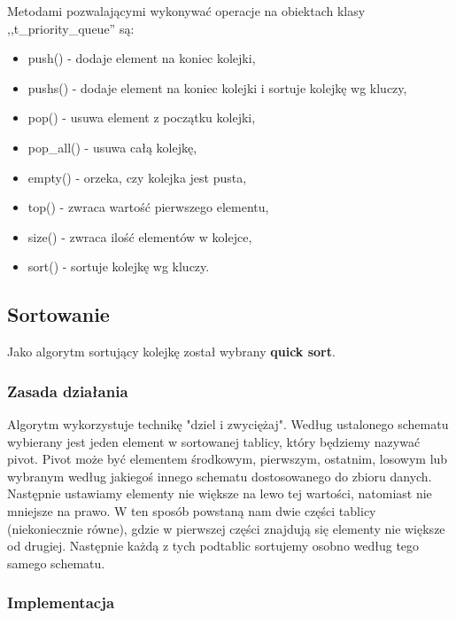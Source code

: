 \documentclass[12pt]{article}
\begin{document}
Metodami pozwalającymi wykonywać operacje na obiektach klasy ,,t\_priority\_queue'' są:
\begin{itemize}
    \item push() - dodaje element na koniec kolejki,
    \item pushs() - dodaje element na koniec kolejki i sortuje kolejkę wg kluczy,
    \item pop() - usuwa element z początku kolejki,
    \item pop\_all() - usuwa całą kolejkę,
    \item empty() - orzeka, czy kolejka jest pusta,
    \item top() - zwraca wartość pierwszego elementu,
    \item size() - zwraca ilość elementów w kolejce,
    \item sort() - sortuje kolejkę wg kluczy. 
\end{itemize}

\subsection{Sortowanie}

Jako algorytm sortujący kolejkę został wybrany \textbf{quick sort}.

\subsubsection{Zasada działania}

Algorytm wykorzystuje technikę "dziel i zwyciężaj". Według ustalonego schematu wybierany jest jeden element w sortowanej 
tablicy, który będziemy nazywać pivot. Pivot może być elementem środkowym, pierwszym, ostatnim, 
losowym lub wybranym według jakiegoś innego schematu dostosowanego do zbioru danych. 
Następnie ustawiamy elementy nie większe na lewo tej wartości, 
natomiast nie mniejsze na prawo. 
W ten sposób powstaną nam dwie części tablicy (niekoniecznie równe), gdzie w 
pierwszej części znajdują się elementy nie większe od drugiej. Następnie każdą z tych 
podtablic sortujemy osobno według tego samego schematu. 

\subsubsection{Implementacja}
\end{document}
